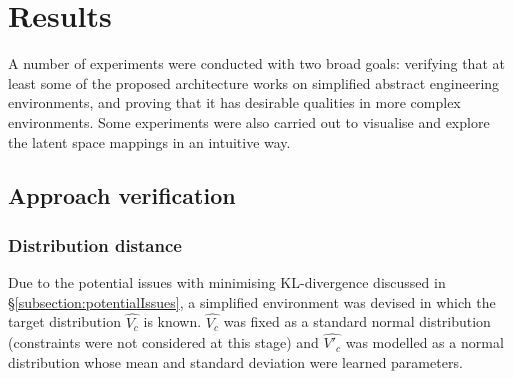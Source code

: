\documentclass[../../main.tex]{subfiles}
\begin{document}
\chapter{Results} \label{chapter:results}

A number of experiments were conducted with two broad goals: verifying that at least some of the proposed architecture works on simplified abstract engineering environments, and proving that it has desirable qualities in more complex environments.
Some experiments were also carried out to visualise and explore the latent space mappings in an intuitive way.

\section{Approach verification} \label{section:approachVerification}

\subsection{Distribution distance} \label{subsection:distributionDistance}

Due to the potential issues with minimising KL-divergence discussed in \S\ref{subsection:potentialIssues}, a simplified environment was devised in which the target distribution $\hat{V_c}$ is known.
$\hat{V_c}$ was fixed as a standard normal distribution (constraints were not considered at this stage) and $\hat{V'_c}$ was modelled as a normal distribution whose mean and standard deviation were learned parameters.
\end{document}

